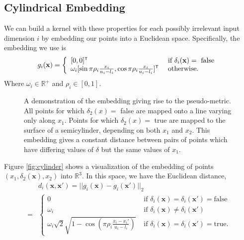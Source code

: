 \documentclass{article}
\renewcommand{\vec}[1]{\mathbf{#1}}
\newcommand{\reals}{\mathds{R}}
\newcommand{\sX}{\mathcal{X}}
\newcommand{\br}{}%
\newcommand\transpose{{\textnormal{\tiny{\sf{T}}}}}
\newcommand{\embeddingletter}{g}
\begin{document}
\subsection{Cylindrical Embedding}
\vspace{-0.05in} 

We can build a kernel with these properties for each possibly irrelevant input dimension $i$ by embedding our points into a Euclidean space.  Specifically, the embedding we use is
%
%
%
\begin{align}
\embeddingletter_i\br(\vec{x}) = \left\{\begin{array}{ll}
[0,0]^\transpose & \textrm{ if } \delta_i(\vec{x}) = \textrm{ false }\\
\omega_i [\sin{\pi\rho_i\frac{x_i}{u_i-l_i}}, \cos{\pi\rho_i\frac{x_i}{u_i-l_i}}]^\transpose & \textrm{ otherwise.}\end{array}\right.
\label{eq:embedding}
\end{align}
Where $\omega_i \in \mathbb{R}^+$ and $\rho_i \in [0,1]$.
%
\begin{figure}
	{\caption{A demonstration of the embedding giving rise to the pseudo-metric.  All points for which $\delta_2(x) =$ false are mapped onto a line varying only along $x_1$.
Points for which $\delta_2(x) =$ true are mapped to the surface of a semicylinder, depending on both $x_1$ and $x_2$.
This embedding gives a constant distance between pairs of points which have differing values of $\delta$ but the same values of $x_1$.}}
	{\hspace{-1cm}}
\vspace{-0.3cm}
\end{figure}
\label{fig:cylinder}

Figure \ref{fig:cylinder} shows a visualization of the embedding of points $(x_1, \delta_2(\vec{x}), x_2)$ into $\reals^3$. 
%
In this space, we have the Euclidean distance,
%
\begin{align}
& d\br_i(\vec{x}, \vec{x}') = 
||\embeddingletter_i\br(\vec{x})-\embeddingletter_i\br(\vec{x}')||_2 \nonumber\\
= & \left\{\begin{array}{ll}
0 & \textrm{ if } \delta_i(\vec{x}) = \delta_i(\vec{x}') = \textrm{false}\\
\omega_i & \textrm{ if } \delta_i(\vec{x}) \neq \delta_i(\vec{x}')\\
\omega_i \sqrt{2} \sqrt{1 - \cos(\pi\rho_i \frac{x_i-x_i'}{u_i-l_i})} & \textrm{ if } \delta_i(\vec{x}) = \delta_i(\vec{x}') = \textrm{true}. \end{array}\right.
\label{eq:distance}
\end{align}
\end{document}
